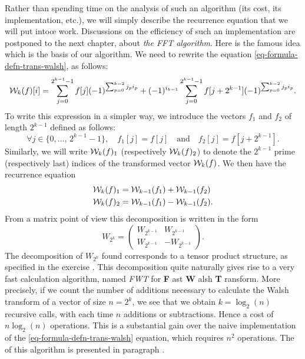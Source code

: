 
 Rather than spending time on the analysis of such an algorithm (its cost, its implementation, etc.), we will simply describe the recurrence equation that we will put into{\oe } work. Discussions on the efficiency of such an implementation are postponed to the next chapter, about \textit{the FFT algorithm}. Here is the famous idea which is the basis of our algorithm. We need to rewrite the equation \eqref{eq-formula-defn-trans-walsh}, as follows:
\begin{equation*}
\mathcal{W}_k (f) [i] = \sum_{j = 0}^{2^{k-1} -1}{f [j] (-1)^{\sum_{p = 0}^{k- 2}{j_p i_p}}} + (-1)^{i_{k-1}} \sum_{j = 0}^{2^{k-1} -1}{f [j + 2^{k -1}] (-1)^{\sum_{p = 0}^{k-2}{j_p i_p}}}.
\end{equation*}
To write this expression in a simpler way, we introduce the vectors $ f_1 $ and $ f_2 $ of length $ 2^{k-1} $ defined as follows:
\begin{equation*}
\forall j \in \{0, \ldots, \, 2^{k-1} -1\}, \quad f_1 [j] = f [j] \quad \text{and} \quad f_2 [j] = f [j + 2^{k-1}].
\end{equation*}
Similarly, we will write $ \mathcal{W}_k (f)_1 $ (respectively $ \mathcal{W}_k (f)_2 $) to denote the $ 2^{k-1} $ prime (respectively last) indices of the transformed vector $ \mathcal{W}_k (f) $. We then have the recurrence equation
\begin{equation*}
\begin{split}
\mathcal{W}_k (f)_1 & = \mathcal{W}_{k-1} (f_1) + \mathcal{W}_{k-1} (f_2) \\
\mathcal{W}_k (f)_2 & = \mathcal{W}_{k-1} (f_1) - \mathcal{W}_{k-1} (f_2).
\end{split}
\end{equation*}
From a matrix point of view this decomposition is written in the form
\begin{equation*}
W_{2^k} = \begin{pmatrix} W_{2^{k-1}} & W_{2^{k-1}} \\W_{2^{k-1}} & -W_{2^{k-1}} \end{pmatrix}.
\end{equation*}
 The decomposition of $ W_{2^k} $ found corresponds to a tensor product structure, as specified in the exercise .  This decomposition quite naturally gives rise to a very fast calculation algorithm, named \textit{FWT} for \textbf{F} ast \textbf{W} alsh \textbf{T} ransform. More precisely, if we count the number of additions necessary to calculate the Walsh transform of a vector of size $ n = 2^k $, we see that we obtain $ k = \log_2 (n ) $ recursive calls, with each time $ n $ additions or subtractions. Hence a cost of $ n \log_2 (n) $ operations. This is a substantial gain over the naive implementation of the \eqref{eq-formula-defn-trans-walsh} equation, which requires $ n^2 $ operations. The \listingterme{} \Matlab{} of this algorithm is presented in paragraph .

